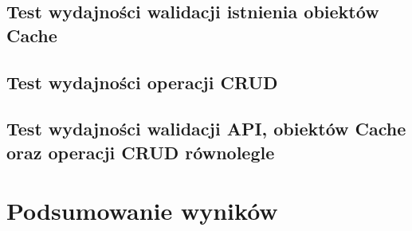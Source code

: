 \subsection{Test wydajności walidacji istnienia obiektów Cache}
% 
% 
\clearpage

\subsection{Test wydajności operacji CRUD}
% 
% 
\clearpage

\subsection{Test wydajności walidacji API, obiektów Cache oraz operacji CRUD równolegle }
% 
% 
\clearpage

\newpage
\section{Podsumowanie wyników}

